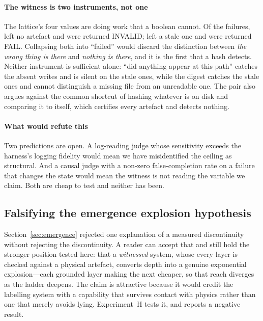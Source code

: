 \documentclass[conference]{IEEEtran}
\theoremstyle{definition}
\begin{document}
\paragraph{The witness is two instruments, not one} The lattice's four values are
doing work that a boolean cannot. Of the \cgFailures{} failures, \cgMissing{} left
no artefact and were returned INVALID; \cgMismatch{} left a stale one and were
returned FAIL. Collapsing both into ``failed'' would discard the distinction
between \emph{the wrong thing is there} and \emph{nothing is there}, and it is the
first that a hash detects. Neither instrument is sufficient alone: ``did anything
appear at this path'' catches the \cgMissing{} absent writes and is silent on the
\cgMismatch{} stale ones, while the digest catches the stale ones and cannot
distinguish a missing file from an unreadable one. The pair also argues against the
common shortcut of hashing whatever is on disk and comparing it to itself, which
certifies every artefact and detects nothing.

\paragraph{What would refute this} Two predictions are open. A log-reading judge
whose sensitivity exceeds the harness's logging fidelity would mean we have
misidentified the ceiling as structural. And a causal judge with a non-zero
false-completion rate on a failure that changes the state would mean the witness
is not reading the variable we claim. Both are cheap to test and neither has been.

\subsection{Falsifying the emergence explosion hypothesis}
\label{sec:falseemergence}

Section~\ref{sec:emergence} rejected one explanation of a measured discontinuity
without rejecting the discontinuity. A reader can accept that and still hold the
stronger position tested here: that a \emph{witnessed} system, whose every layer is
checked against a physical artefact, converts depth into a genuine exponential
explosion---each grounded layer making the next cheaper, so that reach diverges as
the ladder deepens. The claim is attractive because it would credit the labelling
system with a capability that survives contact with physics rather than one that
merely avoids lying. Experiment~H tests it, and reports a negative result.
\end{document}
